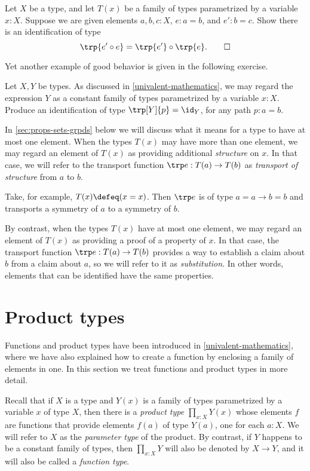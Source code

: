 \begin{xca}\label{xca:trp-compose}
  Let $X$ be a type, and let $T(x)$ be a family of types parametrized by a variable $x:X$.
  Suppose we are given elements $a,b,c:X$, $e:a=b$, and $e':b=c$. Show there is an identification of type
  \[
    \trp {e'\circ e} = \trp {e'} \circ \trp {e}.\qedhere
  \]
\end{xca}

Yet another example of good behavior is given in the following exercise.

\begin{xca}\label{xca:trp-nondep}
  Let $X,Y$ be types.
  As discussed in \cref{univalent-mathematics}, we may regard the expression $Y$ as a constant family of types parametrized by a variable $x:X$.
  Produce an identification of type $\trp[Y]{p} = \id_Y$, for any path $p:a=b$.
\end{xca}

In \cref{sec:props-sets-grpds} below we will discuss what it means for a type to have at most one element.
When the types $T(x)$ may have more than one element,
we may regard an element of $T(x)$ as providing additional \emph{structure} on $x$.
In that case, we will refer to the transport function $\trp e : T(a) \to T(b)$ as
\emph{transport of structure} from $a$ to $b$.

Take, for example, $T(x)\defeq (x=x)$.
Then $\trp e$ is of type $a=a \to b=b$ and transports a
symmetry of $a$ to a symmetry of $b$.

By contrast, when the types
$T(x)$ have at most one element, we may regard an element of $T(x)$
as providing a proof of a property of $x$. In that case, the transport
function $\trp e : T(a) \to T(b)$ provides a way to establish a claim about $b$
from a claim about $a$, so we will refer to it as \emph{substitution}.  In
other words, elements that can be identified have the same properties.

\section{Product types}
\label{sec:product-types}

Functions and product types have been introduced in \cref{univalent-mathematics}, where we have also explained how to create a function by
enclosing a family of elements in one.  In this section we treat functions and product types in more detail.

Recall that if $X$ is a type and $Y(x)$ is a family of types parametrized by a variable $x$ of type $X$, then there is a \emph{product type}
$\prod_{x:X} Y(x)$ whose elements $f$ are functions that provide elements $f(a)$ of type $Y(a)$, one for each $a:X$.  We will refer to $X$ as the
\emph{parameter type} of the product. By contrast, if $Y$ happens to be a constant family of types, then
$\prod_{x:X} Y$ will also be denoted by $X \to Y$, and it will also be called a \emph{function type}.

